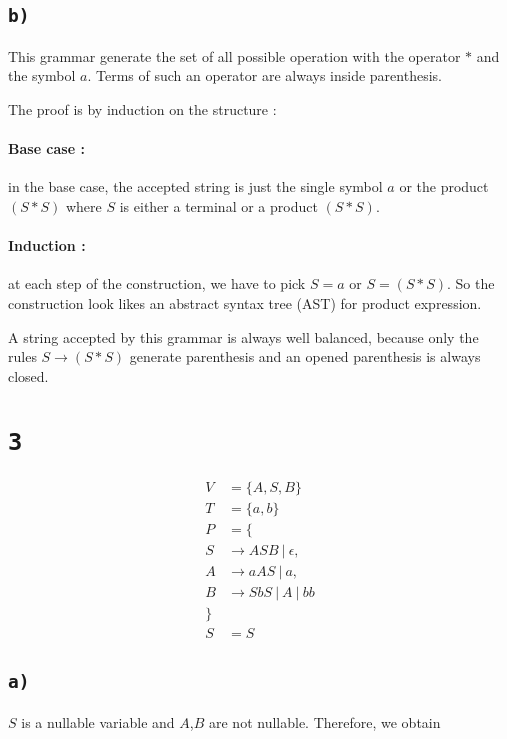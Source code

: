 \documentclass[a4paper,11pt]{report}
\begin{document}
\subsection*{\texttt{b)}}

This grammar generate the set of all possible operation with the operator $*$
and the symbol $a$. Terms of such an operator are always inside parenthesis.

The proof is by induction on the structure :

\paragraph{Base case : } in the base case, the accepted string is just the
single symbol $a$ or the product $(S * S)$ where $S$ is either a terminal or a
product $(S * S)$.

\paragraph{Induction : } at each step of the construction, we have to pick $S =
a$ or $S = (S * S)$. So the construction look likes an abstract syntax tree
(AST) for product expression.

A string accepted by this grammar is always well balanced, because only the
rules $S \to (S*S)$ generate parenthesis and an opened parenthesis is always closed.

\section*{\texttt{3}}

\begin{align*}
  V &= \{A,S,B\} \\
  T &= \{a,b\} \\
  P &= \{ \\
  S &\to ASB\ |\ \epsilon, \\
  A &\to aAS\ |\ a, \\
  B &\to SbS\ |\ A\ |\ bb \\
  \} \\
  S &= S
\end{align*}

\subsection*{\texttt{a)}}

$S$ is a nullable variable and $A$,$B$ are not nullable. Therefore, we obtain
\end{document}
